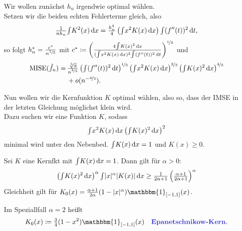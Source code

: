 \documentclass{cheat-sheet}
\newcommand{\ind}{\mathbbm{1}} %
\DeclareMathOperator{\MISE}{MISE} %
\begin{document}

\begin{bem}
  Wir wollen zunächst $h_n$ irgendwie optimal wählen. \\
  Setzen wir die beiden echten Fehlerterme gleich, also
  \[
    \tfrac{1}{n h_n} {\textstyle \int} K^2(x) \,\mathrm{d} x = \tfrac{h_n^4}{4} \left( {\textstyle \int} x^2 K(x) \,\mathrm{d} x \right) {\textstyle \int} (f''(t))^2 \,\mathrm{d} t,
  \]
  so folgt $h_n^{*} = \tfrac{c^*}{n^{\nicefrac{1}{5}}}$ mit $c^* \coloneqq \left( \frac{4 {\textstyle \int} K(x)^2 \,\mathrm{d} x}{({\textstyle \int} x^2 K(x) \,\mathrm{d} x)^2 {\textstyle \int} (f''(t))^2 \,\mathrm{d} t} \right)^{\nicefrac{1}{5}}$
  und
  \begin{align*}
    \MISE(\hat{f}_n) = \, & \tfrac{\sqrt[5]{8}}{n^{\nicefrac{4}{5}}} \left( \IInt{(f''(t))^2}{t} \right)^{\nicefrac{1}{5}} \left( \IInt{x^2 K(x)}{x} \right)^{\nicefrac{2}{5}} \left( \IInt{K(x)^2}{x} \right)^{\nicefrac{4}{5}} \\
    & + o(n^{- \nicefrac{4}{5}}).
  \end{align*}
\end{bem}

\begin{bem}
  Nun wollen wir die Kernfunktion $K$ optimal wählen, also so, dass der IMSE in der letzten Gleichung möglichst klein wird. \\
  Dazu suchen wir eine Funktion $K$, sodass
  \[
    {\textstyle \int} x^2 K(x) \,\mathrm{d} x \left( {\textstyle \int} K(x)^2 \,\mathrm{d} x \right)^2
  \]
  minimal wird unter den Nebenbed. ${\textstyle \int} K(x) \,\mathrm{d} x = 1$ und $K(x) \geq 0$.
\end{bem}

\begin{satz}
  Sei $K$ eine Kernfkt mit ${\textstyle \int} K(x) \,\mathrm{d} x = 1$.
  Dann gilt für $\alpha > 0$:
  \[
    \left( {\textstyle \int} K(x)^2 \,\mathrm{d} x \right)^\alpha {\textstyle \int} \lvert x\rvert^\alpha \lvert K(x)\rvert \,\mathrm{d} x \geq \tfrac{1}{2 \alpha + 1} \left( \tfrac{\alpha + 1}{2 \alpha + 1} \right)^\alpha
  \]
  Gleichheit gilt für $K_0(x) = \tfrac{\alpha+1}{2 \alpha} (1 - \abs{x}^\alpha) \ind_{\cinterval{-1}{1}} (x)$.
\end{satz}

\begin{defn}
  Im Speziallfall $\alpha = 2$ heißt
  \[
    K_0(x) \coloneqq \tfrac{3}{4} (1 - x^2) \ind_{\cinterval{-1}{1}} (x) \quad
    \text{\emph{Epanetschnikow-Kern}}.
  \]
\end{defn}

\end{document}
